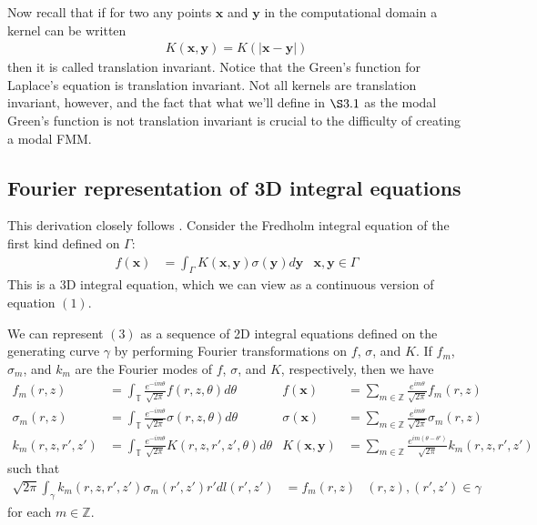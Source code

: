 \documentclass[11pt, oneside]{article}   	%
\begin{document}
Now recall that if for two any points $\mathbf{x}$ and $\mathbf{y}$ in the computational domain a kernel can be written
\begin{align*}
K(\mathbf{x},\mathbf{y}) = K(|\mathbf{x}-\mathbf{y}|)
\end{align*}
then it is called translation invariant. Notice that the Green's function for Laplace's equation is translation invariant. Not all kernels are translation invariant, however, and the fact that what we'll define in $\S3.1$ as the modal Green's function is not translation invariant is crucial to the difficulty of creating a modal FMM.

\subsection{Fourier representation of 3D integral equations}
This derivation closely follows \cite{YYM}. Consider the Fredholm integral equation of the first kind defined on $\Gamma$:
\begin{align}
f(\mathbf{x}) &= \int_\Gamma K(\mathbf{x},\mathbf{y})\sigma(\mathbf{y})d\mathbf{y} &\mathbf{x},\mathbf{y}\in\Gamma
\end{align}
This is a 3D integral equation, which we can view as a continuous version of equation $(1)$.

We can represent $(3)$ as a sequence of 2D integral equations defined on the generating curve $\gamma$ by performing Fourier transformations on $f$, $\sigma$, and $K$. If $f_m$, $\sigma_m$, and $k_m$ are the Fourier modes of $f$, $\sigma$, and $K$, respectively, then we have
\begin{align*}
f_m(r,z)&=\int_\mathbb{T}\frac{e^{-im\theta}}{\sqrt{2\pi}}f(r,z,\theta)d\theta&f(\mathbf{x})&=\sum_{m\in\mathbb{Z}}\frac{e^{im\theta}}{\sqrt{2\pi}}f_m(r,z)\\
\sigma_m(r,z)&=\int_\mathbb{T}\frac{e^{-im\theta}}{\sqrt{2\pi}}\sigma(r,z,\theta)d\theta&\sigma(\mathbf{x})&=\sum_{m\in\mathbb{Z}}\frac{e^{im\theta}}{\sqrt{2\pi}}\sigma_m(r,z)\\
k_m(r,z,r',z')&=\int_\mathbb{T}\frac{e^{-im\theta}}{\sqrt{2\pi}}K(r,z,r',z',\theta)d\theta&K(\mathbf{x},\mathbf{y})&=\sum_{m\in\mathbb{Z}}\frac{e^{im(\theta-\theta')}}{\sqrt{2\pi}}k_m(r,z,r',z')
\end{align*}
such that
\begin{align}
\sqrt{2\pi}\int_\gamma k_m(r,z,r',z')\sigma_m(r',z')r'dl(r',z')&=f_m(r,z) &(r,z),(r',z')\in\gamma
\end{align}
for each $m\in\mathbb{Z}$.
\end{document}
